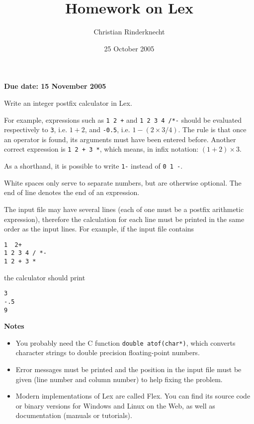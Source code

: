 \documentclass[a4paper,11pt]{article}
\author{Christian Rinderknecht}
\date{25 October 2005}
\title{Homework on Lex}
\newcommand{\Lex}{\textsf{Lex}\xspace}
\newcommand{\Pascal}{\textsf{Pascal}\xspace}
\newcommand{\Clang}{\textsf{C}\xspace}
\begin{document}
\maketitle
\thispagestyle{empty}

\begin{center}
\textbf{Due date: 15 November 2005}
\end{center}

Write an integer postfix calculator in \Lex. 

For example, expressions such as \verb|1 2 +| and \verb|1 2 3 4 /*-|
should be evaluated respectively to \verb+3+, i.e. \(1 + 2\), and
\verb|-0.5|, i.e. \(1 - (2 \times 3/4)\). The rule is that once
an operator is found, its arguments must have been entered
before. Another correct expression is \verb|1 2 + 3 *|, which means,
in infix notation: \((1 + 2) \times 3\).

As a shorthand, it is possible to write \verb|1-| instead of
\verb|0 1 -|.

White spaces only serve to separate numbers, but are otherwise
optional. The end of line denotes the end of an expression.

The input file may have several lines (each of one must be a postfix
arithmetic expression), therefore the calculation for each line must
be printed in the same order as the input lines. For example, if the
input file contains
\begin{verbatim}
1  2+
1 2 3 4 / *-
1 2 + 3 *
\end{verbatim}
the calculator should print
\begin{verbatim}
3
-.5
9
\end{verbatim}


\noindent \textbf{Notes}
\begin{itemize}

  \item You probably need the \Clang function
    \verb+double atof(char*)+, which converts character strings to
    double precision floating-point numbers.

  \item Error messages must be printed and the position in the input
    file must be given (line number and column number) to help fixing
    the problem.

  \item Modern implementations of \Lex are called \textsf{Flex}. You
    can find its source code or binary versions for Windows and Linux
    on the Web, as well as documentation (manuals or tutorials).

\end{itemize}
\end{document}
